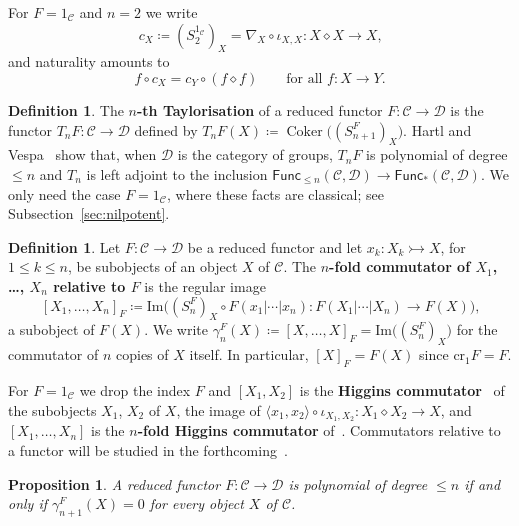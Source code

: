 \documentclass[reqno,a4paper]{amsart}
\theoremstyle{plain}
\newtheorem{proposition}[subsection]{Proposition}
\theoremstyle{definition}
\newtheorem{definition}[subsection]{Definition}
\newcommand{\defn}{\textbf}
\newcommand{\DefEq}{\coloneq}
\newcommand{\C}{\ensuremath{\mathcal{C}}}
\newcommand{\D}{\ensuremath{\mathcal{D}}}
\newcommand{\Func}{\ensuremath{\mathsf{Func}}}
\newcommand{\cre}{\ensuremath{\mathrm{cr}}}
\DeclareMathOperator{\Coker}{Coker}
\renewcommand{\Im}{\ensuremath{\mathrm{Im}}}
\newcommand{\cosmash}{\ensuremath{\diamond}}
\newcommand{\cc}[1]{\ensuremath{c_{#1}}}                    %
\newcommand{\fold}[1]{\ensuremath{\nabla_{#1}}}            %
\begin{document}
For \(F=1_{\C}\) and \(n=2\) we write
\[
  \cc{X}\DefEq(S^{1_{\C}}_{2})_{X}=\fold{X}\circ\iota_{X,X}\colon X\cosmash X\to X\text{,}
\]
and naturality amounts to
\begin{equation}\label{eq:c-natural}
  f\circ\cc{X}=\cc{Y}\circ(f\cosmash f)\qquad\text{for all \(f\colon X\to Y\).}
\end{equation}

\begin{definition}\label{def:taylorisation}
  The \defn{\(n\)-th Taylorisation} of a reduced functor \(F\colon \C\to\D\) is the functor \(T_{n}F\colon \C\to\D\) defined by \(T_{n}F(X)\DefEq\Coker\bigl((S^{F}_{n+1})_{X}\bigr)\). Hartl and Vespa~\cite[Definition~1.9, Proposition~1.10]{Hartl-Vespa} show that, when \(\D\) is the category of groups, \(T_{n}F\) is polynomial of degree \(\leq n\) and \(T_{n}\) is left adjoint to the inclusion \(\Func_{\leq n}(\C,\D)\to\Func_{*}(\C,\D)\). We only need the case \(F=1_{\C}\), where these facts are classical; see Subsection~\ref{sec:nilpotent}.
\end{definition}

\begin{definition}\label{def:commutator}
  Let \(F\colon \C\to\D\) be a reduced functor and let \(x_{k}\colon X_{k}\rightarrowtail X\), for \(1\leq k\leq n\), be subobjects of an object \(X\) of \(\C\). The \defn{\(n\)-fold commutator of \(X_{1}\), \dots, \(X_{n}\) relative to \(F\)} is the regular image
  \[
    [X_{1},\dots,X_{n}]_{F}\DefEq\Im\bigl((S^{F}_{n})_{X}\circ F(x_{1}|\cdots|x_{n})\colon F(X_{1}|\cdots|X_{n})\to F(X)\bigr)\text{,}
  \]
  a subobject of \(F(X)\). We write \(\gamma^{F}_{n}(X)\DefEq[X,\dots,X]_{F}=\Im\bigl((S^{F}_{n})_{X}\bigr)\) for the commutator of \(n\) copies of \(X\) itself. In particular, \([X]_{F}=F(X)\) since \(\cre_{1}F=F\).
\end{definition}

For \(F=1_{\C}\) we drop the index \(F\) and \([X_{1},X_{2}]\) is the \defn{Higgins commutator}~\cite{MM} of the subobjects \(X_{1}\), \(X_{2}\) of \(X\), the image of \(\langle x_{1},x_{2}\rangle\circ\iota_{X_{1},X_{2}}\colon X_{1}\cosmash X_{2}\to X\), and \([X_{1},\dots,X_{n}]\) is the \defn{\(n\)-fold Higgins commutator} of~\cite[Definition~2.14]{HVdL}. Commutators relative to a functor will be studied in the forthcoming~\cite{Hartl-Linearization}.

\begin{proposition}\label{prop:polynomial-iff-commutators}
  A reduced functor \(F\colon \C\to\D\) is polynomial of degree \(\leq n\) if and only if \(\gamma^{F}_{n+1}(X)=0\) for every object \(X\) of \(\C\).
\end{proposition}
\end{document}
